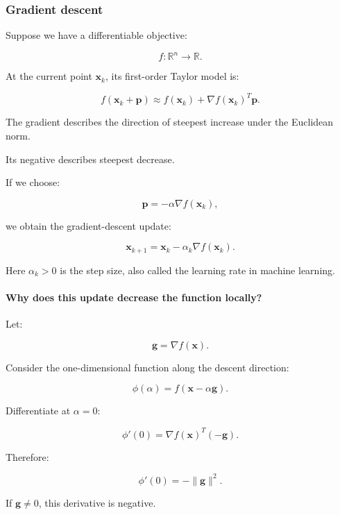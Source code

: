 \subsubsection{Gradient descent}\label{02-foundations-ii-ch026-gradient-descent}

\hypertarget{02-foundations-ii-ch026-gradient-descent}{}

Suppose we have a differentiable objective:

\[
f:\mathbb R^n\to\mathbb R.
\]

At the current point \(\mathbf x_k\), its first-order Taylor model is:

\[
f(\mathbf x_k+\mathbf p) \approx f(\mathbf x_k)+\nabla f(\mathbf x_k)^T\mathbf p.
\]

The gradient describes the direction of steepest increase under the Euclidean norm.

Its negative describes steepest decrease.

If we choose:

\[
\mathbf p=-\alpha\nabla f(\mathbf x_k),
\]

we obtain the gradient-descent update:

\[
\boxed{ \mathbf x_{k+1} = \mathbf x_k-\alpha_k\nabla f(\mathbf x_k) }.
\]

Here \(\alpha_k>0\) is the step size, also called the learning rate in machine learning.

\paragraph{Why does this update decrease the function locally?}\label{02-foundations-ii-ch026-why-does-this-update-decrease-the-function-locally}

\hypertarget{02-foundations-ii-ch026-why-does-this-update-decrease-the-function-locally}{}

Let:

\[
\mathbf g=\nabla f(\mathbf x).
\]

Consider the one-dimensional function along the descent direction:

\[
\phi(\alpha)=f(\mathbf x-\alpha\mathbf g).
\]

Differentiate at \(\alpha=0\):

\[
\phi'(0)= \nabla f(\mathbf x)^T(-\mathbf g).
\]

Therefore:

\[
\boxed{ \phi'(0)=-\|\mathbf g\|^2 }.
\]

If \(\mathbf g\ne0\), this derivative is negative.

